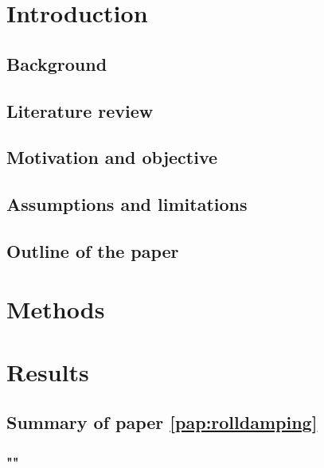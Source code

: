\chapter{Introduction}
\section{Background}

\section{Literature review}

\section{Motivation and objective}

\section{Assumptions and limitations}

\section{Outline of the paper}


\chapter{Methods\label{ch:methods}}

\chapter{Results\label{ch:results}}

\section{Summary of paper \ref{pap:rolldamping}}
\subsection*{""}

